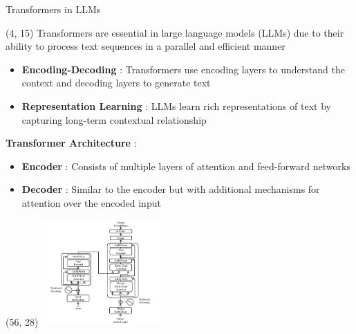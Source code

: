 \begin{frame}{Transformers in LLMs}
  \begin{textblock}{52}(4, 15)
    Transformers are essential in large language models (LLMs) due to their ability to process text sequences in a parallel and efficient manner

    \begin{itemize}
        \item \textbf{Encoding-Decoding} : Transformers use encoding layers to understand the context and decoding layers to generate text
        \item \textbf{Representation Learning} : LLMs learn rich representations of text by capturing long-term contextual relationship
    \end{itemize}

    \textbf{Transformer Architecture} : \\
    \begin{itemize}
        \item \textbf{Encoder} : Consists of multiple layers of attention and feed-forward networks
        \item \textbf{Decoder} : Similar to the encoder but with additional mechanisms for attention over the encoded input
    \end{itemize}
  \end{textblock}
  \begin{textblock}{35}(56, 28)
    \includegraphics[width=170px]{img/transformer_architecture.png} %
  \end{textblock}
\end{frame}

